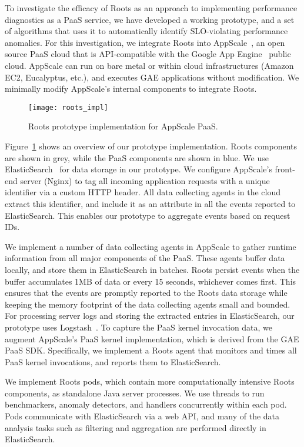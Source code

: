 To investigate the efficacy of Roots as an approach to
implementing performance diagnostics as a PaaS service, we have developed a
working prototype, and a set of algorithms that uses it to automatically
identify SLO-violating performance anomalies.
For this investigation, we integrate Roots into AppScale~\cite{6488671}, an open source PaaS cloud
that is API-compatible with the Google App Engine~\cite{gae} public cloud.  
AppScale can run on bare metal or within cloud infrastructures (Amazon EC2, Eucalyptus, 
etc.), and executes GAE applications without modification.
We minimally modify AppScale's internal components to integrate Roots.

\begin{figure}
\centering
\texttt{[image: roots\_impl]}
\caption{Roots prototype implementation for AppScale PaaS.}
\label{fig:roots_impl}
\end{figure}

Figure~\ref{fig:roots_impl} shows an overview of our prototype implementation. Roots components
are shown in grey, while the PaaS components are shown in blue.
We use ElasticSearch~\cite{Kononenko:2014:MMR:2597073.2597091} for data storage in our prototype. 
We configure AppScale's front-end server (Nginx) to tag all incoming application requests
with a unique identifier via a custom HTTP header. 
All data collecting agents in the cloud extract this identifier, and include it as an attribute
in all the events reported to ElasticSearch. This enables our prototype to aggregate events based 
on request IDs.

We implement a number of data collecting agents in AppScale to gather runtime information
from all major components of the PaaS. These agents buffer data locally, and store them in ElasticSearch
in batches. Roots persist events when the buffer accumulates 1MB of data or every 15 seconds, whichever comes
first.  This ensures that the events are promptly reported to the Roots data
storage while keeping the memory footprint of the data collecting agents small and bounded. 
For processing server logs and storing the extracted entries in ElasticSearch,
our prototype uses Logstash~\cite{logstash}. 
To capture the PaaS kernel invocation data, we augment AppScale's PaaS kernel implementation,
which is derived from the GAE PaaS SDK. Specifically, we implement a Roots agent that monitors
and times all PaaS kernel invocations, and reports them to ElasticSearch. 

We implement Roots pods, which contain more computationally intensive Roots components, 
as standalone Java server processes. We use threads to run benchmarkers,
anomaly detectors, and handlers concurrently within each pod. Pods communicate with ElasticSearch via
a web API, and many of the data analysis tasks such as filtering and aggregation are performed
directly in ElasticSearch.

